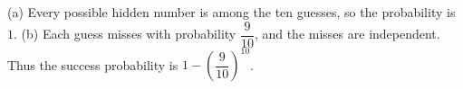(a) Every possible hidden number is among the ten guesses, so the probability is $\boxed1 $. (b) Each guess misses with probability $\dfrac{9}{10}$, and the misses are independent. Thus the success probability is $\boxed{1-(\dfrac{9}{10})^{10}}$.
